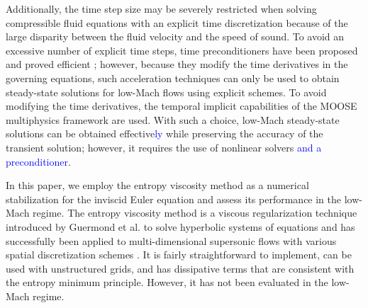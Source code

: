 \documentclass[preprint,10pt]{elsarticle}
\newcommand{\tcb}[1]{\textcolor{blue}{#1}}
\begin{document}
Additionally, the time step size may be severely restricted when solving compressible fluid equations with an explicit time discretization 
because of the large disparity between the fluid velocity and the speed of sound. 
To avoid an excessive number of explicit time steps, time preconditioners have been proposed and proved efficient \cite{LowMach2};
however, because they modify the time derivatives in the governing equations, such acceleration techniques can only be used to obtain
steady-state solutions for low-Mach flows using explicit schemes.
To avoid modifying the time derivatives, 
the temporal implicit capabilities of the MOOSE multiphysics framework \cite{MOOSE} are used. With such a choice, low-Mach steady-state solutions 
can be obtained effective\tcb{ly} while preserving the accuracy of the transient solution; however, it requires the use of nonlinear solvers \tcb{and a preconditioner}.

In this paper, we employ the entropy viscosity method as a numerical stabilization for the inviscid Euler equation and assess its performance 
in the low-Mach regime. 
The entropy viscosity method is a viscous regularization technique introduced by Guermond et al. to solve hyperbolic systems of equations
and has successfully been applied to multi-dimensional supersonic flows with various spatial discretization schemes \cite{jlg}. 
It is fairly straightforward to implement, can be used with unstructured grids, and has dissipative terms that are consistent with the 
entropy minimum principle. However, it has not been evaluated in the low-Mach regime.
\end{document}
